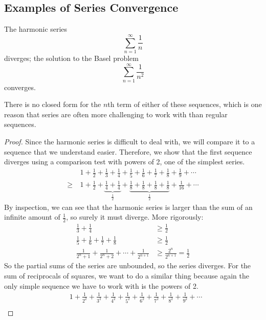 \subsection{Examples of Series Convergence}
\begin{proposition}
	The harmonic series
	\[
		\sum_{n=1}^\infty \frac 1 n
	\]
	diverges; the solution to the Basel problem
	\[
		\sum_{n=1}^\infty \frac 1 {n^2}
	\]
	converges.
\end{proposition}
There is no closed form for the \(n\)th term of either of these sequences, which is one reason that series are often more challenging to work with than regular sequences.
\begin{proof}
	Since the harmonic series is difficult to deal with, we will compare it to a sequence that we understand easier.
	Therefore, we show that the first sequence diverges using a comparison test with powers of 2, one of the simplest series.
	\begin{align*}
		       & 1 + \frac 1 2 + \frac 1 3 + \frac 1 4 + \frac 1 5 + \frac 1 6 + \frac 1 7 + \frac 1 8 + \frac 1 9 + \cdots                                                      \\
		\geq\  & 1 + \frac 1 2 + \underbrace{\frac 1 4 + \frac 1 4}_{\frac 1 2} + \underbrace{\frac 1 8 + \frac 1 8 + \frac 1 8 + \frac 1 8}_{\frac 1 2} + \frac 1 {16} + \cdots
	\end{align*}
	By inspection, we can see that the harmonic series is larger than the sum of an infinite amount of \(\frac 1 2\), so surely it must diverge.
	More rigorously:
	\begin{align*}
		\frac 1 3 + \frac 1 4                                              & \geq \frac 1 2                         \\
		\frac 1 5 + \frac 1 6 + \frac 1 7 + \frac 1 8                      & \geq \frac 1 2                         \\
		\frac{1}{2^n + 1} + \frac{1}{2^n + 2} + \cdots + \frac{1}{2^{n+1}} & \geq \frac{2^n}{2^{n+1}} = \frac{1}{2}
	\end{align*}
	So the partial sums of the series are unbounded, so the series diverges.
	For the sum of reciprocals of squares, we want to do a similar thing because again the only simple sequence we have to work with is the powers of 2.
	\begin{align*}
		       & 1 + \frac 1 {2^2} + \frac 1 {3^2} + \frac 1 {4^2} + \frac 1 {5^2} + \frac 1 {6^2} + \frac 1 {7^2} + \frac 1 {8^2} + \frac 1 {9^2} + \cdots                                                           \\

\end{align*}
\end{proof}
